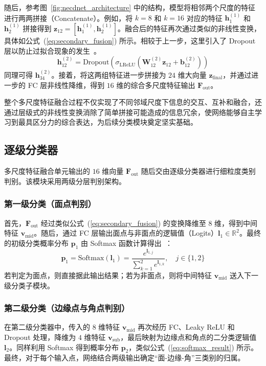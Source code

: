 随后，参考图~\ref{fig:necdnet_architecture} 中的结构，模型将相邻两个尺度的特征进行两两拼接（Concatenate）。例如，将 $k=8$ 和 $k=16$ 对应的特征 $\mathbf{h}_1^{(1)}$ 和 $\mathbf{h}_2^{(1)}$ 拼接得到 $\mathbf{z}_{12} = [\mathbf{h}_1^{(1)}, \mathbf{h}_2^{(1)}]$。融合后的特征再次通过类似的非线性变换，具体如公式~(\ref{eq:secondary_fusion}) 所示。相较于上一步，这里引入了 Dropout 层以防止过拟合现象的发生~\cite{srivastava_dropout_2014}。
\begin{equation}
    \mathbf{h}_{12}^{(2)} = \text{Dropout}\left(\sigma_{\text{LReLU}}(\mathbf{W}_{12}^{(2)} \mathbf{z}_{12} + \mathbf{b}_{12}^{(2)})\right)
    \label{eq:secondary_fusion}
\end{equation}
同理可得 $\mathbf{h}_{34}^{(2)}$。接着，将这两组特征进一步拼接为 $24$ 维大向量 $\mathbf{z}_{\text{final}}$，并通过进一步的 FC 层非线性降维，得到 $16$ 维的综合多尺度特征输出 $\mathbf{F}_{\text{out}}$。

整个多尺度特征融合过程不仅实现了不同邻域尺度下信息的交互、互补和融合，还通过层级式的非线性变换消除了简单拼接可能造成的信息冗余，使网络能够自主学习到最具区分力的综合表达，为后续分类模块奠定坚实基础。

\subsection{逐级分类器}
多尺度特征融合单元输出的 $16$ 维向量 $\mathbf{F}_{\text{out}}$ 随后交由逐级分类器进行细粒度类别判别。该模块采用两级分层判别架构。

\subsubsection{第一级分类（面点判别）}
首先，$\mathbf{F}_{\text{out}}$ 经过类似公式~(\ref{eq:secondary_fusion}) 的变换降维至 $8$ 维，得到中间特征 $\mathbf{v}_{\text{mid}}$。随后，通过 FC 层输出面点与非面点的逻辑值（Logits）$\mathbf{l}_1 \in \mathbb{R}^2$。最终的初级分类概率分布 $\mathbf{p}_1$ 由 Softmax 函数计算得出~\cite{bishop_pattern_2006}：
\begin{equation}
    \mathbf{p}_1 = \text{Softmax}(\mathbf{l}_1) = \frac{e^{\mathbf{l}_{1,j}}}{\sum_{k=1}^{2} e^{\mathbf{l}_{1,k}}}, \quad j \in \{1, 2\}
    \label{eq:softmax_result}
\end{equation}
若判定为面点，则直接据此输出结果；若为非面点，则将中间特征 $\mathbf{v}_{\text{mid}}$ 送入下一级分类子模块。

\subsubsection{第二级分类（边缘点与角点判别）}
在第二级分类器中，传入的 $8$ 维特征 $\mathbf{v}_{\text{mid}}$ 再次经历 FC、Leaky ReLU 和 Dropout 处理，降维为 $4$ 维特征 $\mathbf{v}_{\text{sub}}$，最后映射为边缘点和角点的二分类逻辑值 $\mathbf{l}_2$。同样利用 Softmax 得到概率分布 $\mathbf{p}_2$，类似公式~(\ref{eq:softmax_result}) 所示。
最终，对于每个输入点，网络结合两级输出确定“面-边缘-角”三类别的归属。

